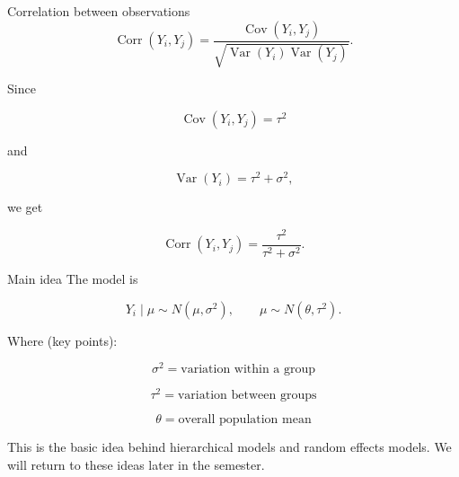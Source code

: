 \documentclass[aspectratio=43,11pt]{beamer}
\begin{document}
{\begin{frame}{Correlation between observations}
\[
\operatorname{Corr}(Y_i,Y_j)
=
\frac{\operatorname{Cov}(Y_i,Y_j)}
{\sqrt{\operatorname{Var}(Y_i)\operatorname{Var}(Y_j)}}.
\]

Since

\[
\operatorname{Cov}(Y_i,Y_j)=\tau^2
\]

and

\[
\operatorname{Var}(Y_i)=\tau^2+\sigma^2,
\]

we get

\[
\operatorname{Corr}(Y_i,Y_j)
=
\frac{\tau^2}{\tau^2+\sigma^2}.
\]
\end{frame}

\begin{frame}{Main idea}
The model is

\[
Y_i \mid \mu \sim N(\mu,\sigma^2),
\qquad
\mu \sim N(\theta,\tau^2).
\]

\medskip
Where (key points):

\[
\sigma^2 = \text{variation within a group}
\]

\[
\tau^2 = \text{variation between groups}
\]

\[
\theta = \text{overall population mean}
\]

\medskip
This is the basic idea behind hierarchical models and random effects models.
We will return to these ideas later in the semester.
\end{frame}
}
\end{document}
